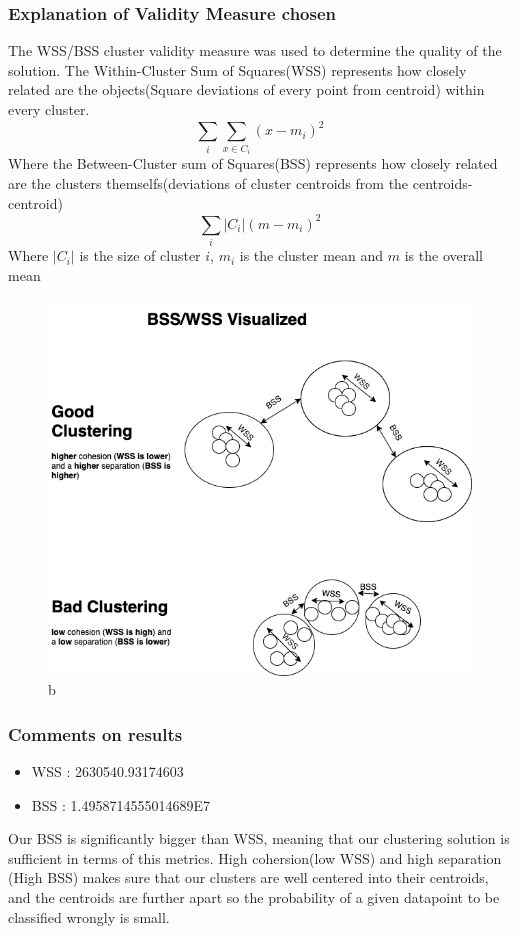 \documentclass[openany]{book}
\begin{document}
				\subsubsection{Explanation of Validity Measure chosen}
					The WSS/BSS cluster validity measure was used to determine the quality of the solution.
					The Within-Cluster Sum of Squares(WSS) represents how closely related are the objects(Square deviations of every point from centroid) within every cluster.
					\begin{equation}
						\sum_{i}^{}\sum_{x\in{C_i}}^{}{(x-m_{i})^2}
					\end{equation}
					Where the Between-Cluster sum of Squares(BSS) represents how closely related are the clusters themselfs(deviations of cluster centroids from the centroids-centroid) 
					\begin{equation}
						\sum_{i}^{}{|C_i|(m-m_{i})^2}
					\end{equation}
					Where $|C_i|$ is the size of cluster $i$, $m_i$ is the cluster mean and $m$ is the overall mean
					\begin{figure}[H]
						\iftrue
						\centering
						\caption{b}
						\includegraphics[scale=0.3]{res/bss-wss}
						\fi
					\end{figure}
				\subsubsection{Comments on results}
					\begin{itemize}
						\item WSS : 2630540.93174603
						\item BSS : 1.4958714555014689E7
					\end{itemize}
					Our BSS is significantly bigger than WSS, meaning that our clustering solution is sufficient in terms of this metrics. High cohersion(low WSS)
					and high separation (High BSS) makes sure that our clusters are well centered into their centroids, and the centroids are further apart so 
					the probability of a given datapoint to be classified wrongly is small. 
\end{document}
